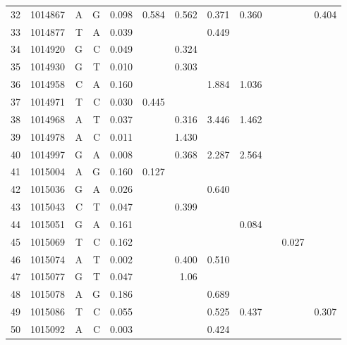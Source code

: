 \documentclass{bmcart}
\begin{document}
\begin{table}[htbp]
\begin{threeparttable}
\begin{tabular}{rrrrrrrrrrrr}
    32    & 1014867 & A     & G     & 0.098 & 0.584 & 0.562 & 0.371 & 0.360 &       &       & 0.404 \\
    33    & 1014877 & T     & A     & 0.039 &       &       & 0.449 &       &       &       &  \\
    34    & 1014920 & G     & C     & 0.049 &       & 0.324 &       &       &       &       &  \\
    35    & 1014930 & G     & T     & 0.010 &       & 0.303 &       &       &       &       &  \\
    36    & 1014958 & C     & A     & 0.160 &       &       & 1.884 & 1.036 &       &       &  \\
    37    & 1014971 & T     & C     & 0.030 & 0.445 &       &       &       &       &       &  \\
    38    & 1014968 & A     & T     & 0.037 &       & 0.316 & 3.446 & 1.462 &       &       &  \\
    39    & 1014978 & A     & C     & 0.011 &       & 1.430 &       &       &       &       &  \\
    40    & 1014997 & G     & A     & 0.008 &       & 0.368 & 2.287 & 2.564 &       &       &  \\
    41    & 1015004 & A     & G     & 0.160 & 0.127 &       &       &       &       &       &  \\
    42    & 1015036 & G     & A     & 0.026 &       &       & 0.640 &       &       &       &  \\
    43    & 1015043 & C     & T     & 0.047 &       & 0.399 &       &       &       &       &  \\
    44    & 1015051 & G     & A     & 0.161 &       &       &       & 0.084 &       &       &  \\
    45    & 1015069 & T     & C     & 0.162 &       &       &       &       &       & 0.027 &  \\
    46    & 1015074 & A     & T     & 0.002 &       & 0.400 & 0.510 &       &       &       &  \\
    47    & 1015077 & G     & T     & 0.047 &       & 1.06  &       &       &       &       &  \\
    48    & 1015078 & A     & G     & 0.186 &       &       & 0.689 &       &       &       &  \\
    49    & 1015086 & T     & C     & 0.055 &       &       & 0.525 & 0.437 &       &       & 0.307 \\
    50    & 1015092 & A     & C     & 0.003 &       &       & 0.424 &       &       &       &  \\

\end{tabular}
\end{threeparttable}
\end{table}
\end{document}
